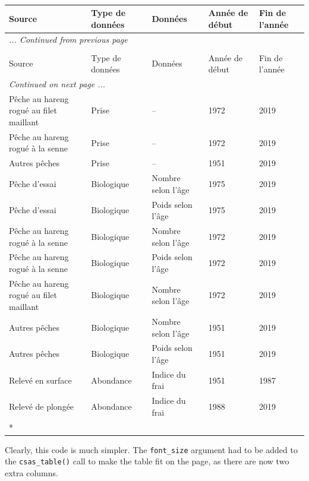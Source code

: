 \documentclass[12pt]{article}\usepackage[]{graphicx}\usepackage[]{color}
\begin{document}
\begingroup\fontsize{10}{12}\selectfont \begingroup\fontsize{10}{12}\selectfont  
\begin{longtable}[t]{lllll} \caption{\label{tab:herring-simple}}\\ \toprule Source & Type de données & Données & Année de début & Fin de l'année\\ \midrule \endfirsthead \multicolumn{5}{l}{\textit{... Continued from previous page}} \\ \hline \caption*{}\\ \toprule Source & Type de données & Données & Année de début & Fin de l'année\\ \midrule \endhead \hline \multicolumn{5}{l}{\textit{Continued on next page ...}} \\ \endfoot \bottomrule \endlastfoot Pêche au hareng rogué au filet maillant & Prise & -- & 1972 & 2019\\ Pêche au hareng rogué à la senne & Prise & -- & 1972 & 2019\\ Autres pêches & Prise & -- & 1951 & 2019\\ Pêche d'essai & Biologique & Nombre selon l’âge & 1975 & 2019\\ Pêche d'essai & Biologique & Poids selon l’âge & 1975 & 2019\\ Pêche au hareng rogué à la senne & Biologique & Nombre selon l’âge & 1972 & 2019\\ Pêche au hareng rogué à la senne & Biologique & Poids selon l’âge & 1972 & 2019\\ Pêche au hareng rogué au filet maillant & Biologique & Nombre selon l’âge & 1972 & 2019\\ Autres pêches & Biologique & Nombre selon l’âge & 1951 & 2019\\ Autres pêches & Biologique & Poids selon l’âge & 1951 & 2019\\ Relevé en surface & Abondance & Indice du frai & 1951 & 1987\\ Relevé de plongée & Abondance & Indice du frai & 1988 & 2019\\* \end{longtable}

\endgroup{} \endgroup{}

Clearly, this code is much simpler. The \texttt{font\_size} argument had to be added to the \texttt{csas\_table()} call to make the table fit on the page, as there are now two extra columns.
\end{document}
